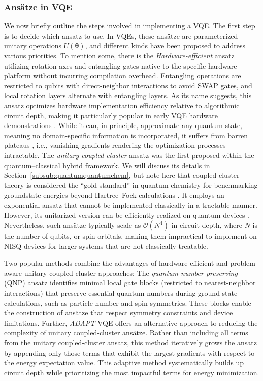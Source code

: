 \documentclass[../main.tex]{subfiles}
\begin{document}
\subsubsection{Ansätze in VQE}

We now briefly outline the steps involved in implementing a \ac{VQE}.
The first step is to decide which ansatz to use. In VQEs, these ansätze are parameterized unitary operations $U(\bm{\theta})$, and different kinds have been proposed to address various priorities. 
To mention some, there is the \textit{Hardware-efficient} ansatz utilizing rotation axes and entangling gates native to the specific hardware platform without incurring compilation overhead. Entangling operations are restricted to qubits with direct-neighbor interactions to avoid SWAP gates, and local rotation layers alternate with entangling layers. As its name suggests, this ansatz optimizes hardware implementation efficiency relative to algorithmic circuit depth, making it particularly popular in early VQE hardware demonstrations \cite{kandala2017hardware}. While it can, in principle, approximate any quantum state, meaning no domain-specific information is incorporated, it suffers from barren plateaus \cite{holmes2022connecting}, i.e., vanishing gradients rendering the optimization processes intractable.
The \textit{unitary coupled-cluster} ansatz was the first proposed within the quantum–classical hybrid framework. We will discuss its details in Section~\ref{subsub:quantumquantumchem}, but note here that coupled-cluster theory is considered the ``gold standard''  in quantum chemistry for benchmarking groundstate energies beyond Hartree–Fock calculations \cite{bartlett2007coupled}. It employs an exponential ansatz that cannot be implemented classically in a tractable manner. However, its unitarized version can be efficiently realized on quantum devices \cite{peruzzo2014variational, mcclean2016theory}. Nevertheless, such ansätze typically scale as $\mathcal{O}(N^4)$ in circuit depth, where $N$ is the number of qubits, or spin orbitals, making them impractical to implement on NISQ-devices for larger systems that are not classically treatable.

Two popular methods combine the advantages of hardware-efficient and problem-aware unitary coupled-cluster approaches: The \textit{quantum number preserving} (QNP) ansatz \cite{anselmetti2021local} identifies minimal local gate blocks (restricted to nearest-neighbor interactions) that preserve essential quantum numbers during ground-state calculations, such as particle number and spin symmetries. These blocks enable the construction of ansätze that respect symmetry constraints and device limitations. 
Further, \textit{ADAPT}-VQE \cite{grimsley2019adaptive} offers an alternative approach to reducing the complexity of unitary coupled-cluster ansätze. Rather than including all terms from the unitary coupled-cluster ansatz, this method iteratively grows the ansatz by appending only those terms that exhibit the largest gradients with respect to the energy expectation value. This adaptive method systematically builds up circuit depth while prioritizing the most impactful terms for energy minimization.
\end{document}
